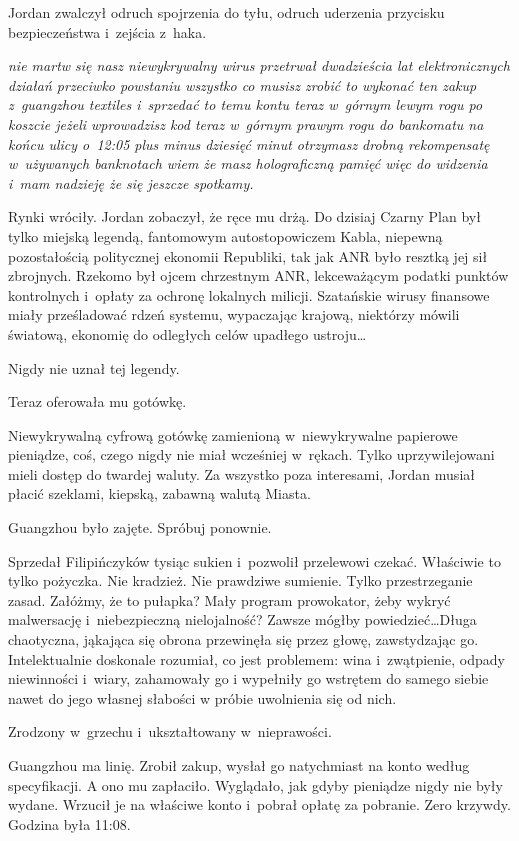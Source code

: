 \documentclass[oneside,polish,11pt,sfheadings]{mwbk}
\begin{document}
Jordan zwalczył odruch spojrzenia do tyłu, odruch uderzenia przycisku
bezpieczeństwa i~zejścia z~haka.

\emph{nie martw się nasz niewykrywalny wirus przetrwał dwadzieścia lat
elektronicznych działań przeciwko powstaniu wszystko co musisz zrobić to
wykonać ten zakup z~guangzhou textiles i~sprzedać to temu kontu teraz w~górnym lewym rogu po koszcie jeżeli wprowadzisz kod teraz w~górnym
prawym rogu do bankomatu na końcu ulicy o~12:05 plus minus dziesięć
minut otrzymasz drobną rekompensatę w~używanych banknotach wiem że masz
holograficzną pamięć więc do widzenia i~mam nadzieję że się jeszcze
spotkamy.}

Rynki wróciły. Jordan zobaczył, że ręce mu drżą. Do dzisiaj Czarny Plan
był tylko miejską legendą, fantomowym autostopowiczem Kabla, niepewną
pozostałością politycznej ekonomii Republiki, tak jak ANR było resztką
jej sił zbrojnych. Rzekomo był ojcem chrzestnym ANR, lekceważącym
podatki punktów kontrolnych i~opłaty za ochronę lokalnych milicji.
Szatańskie wirusy finansowe miały prześladować rdzeń systemu, wypaczając
krajową, niektórzy mówili światową, ekonomię do odległych celów upadłego
ustroju\ldots

Nigdy nie uznał tej legendy.

Teraz oferowała mu gotówkę.

Niewykrywalną cyfrową gotówkę zamienioną w~niewykrywalne papierowe
pieniądze, coś, czego nigdy nie miał wcześniej w~rękach. Tylko
uprzywilejowani mieli dostęp do twardej waluty. Za wszyst\-ko poza
interesami, Jordan musiał płacić szeklami, kiepską, zabawną walutą
Miasta.

Guangzhou było zajęte. Spróbuj ponownie.

Sprzedał Filipińczyków tysiąc sukien i~pozwolił przelewowi czekać.
Właściwie to tylko pożyczka. Nie kradzież. Nie prawdziwe sumienie. Tylko
przestrzeganie zasad. Załóżmy, że to pułapka? Mały program prowokator,
żeby wykryć malwersację i~niebezpieczną nielojalność? Zawsze mógłby
powiedzieć\ldots Długa chaotyczna, jąkająca się obrona przewinęła się przez
głowę, zawstydzając go. Intelektualnie doskonale rozumiał, co jest
problemem: wina i~zwątpienie, odpady niewinności i~wiary, zahamowały go
i wypełniły go wstrętem do samego siebie nawet do jego własnej słabości
w próbie uwolnienia się od nich.

Zrodzony w~grzechu i~ukształtowany w~nieprawości.

Guangzhou ma linię. Zrobił zakup, wysłał go natychmiast na konto według
specyfikacji. A ono mu zapłaciło. Wyglądało, jak gdyby pieniądze nigdy
nie były wydane. Wrzucił je na właściwe konto i~pobrał opłatę za
pobranie. Zero krzywdy. Godzina była 11:08.
\end{document}
